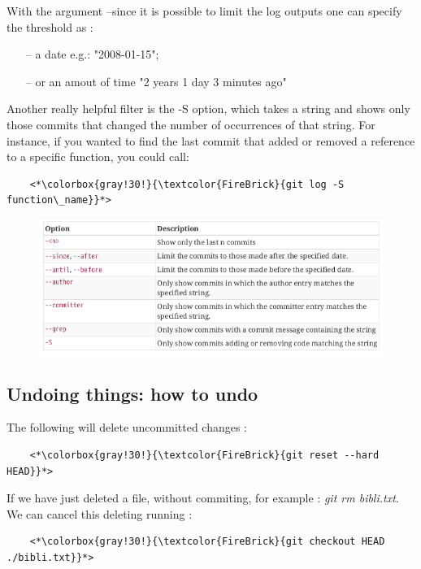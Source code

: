 \documentclass[a4paper,12pt]{article}
\numberwithin{equation}{section} %
\begin{document}
With the argument --since it is possible to limit the log outputs one can specify the threshold as :
\begin{itemize}
	\item[--] a date e.g.: "2008-01-15"; \\
	\item[--] or an amout of time "2 years 1 day 3 minutes ago" \\[4mm]
\end{itemize}

Another really helpful filter is the -S option, which takes a string and shows only those commits that changed the number of occurrences of that string. For instance, if you wanted to find the last commit that added or removed a reference to a specific function, you could call:
\begin{lstlisting}
	<*\colorbox{gray!30!}{\textcolor{FireBrick}{git log -S function\_name}}*>
\end{lstlisting}

\begin{figure}[!ht]
\centering
\includegraphics[scale=0.7]{./pic/tab_log.png}
\end{figure}

\pagebreak

\subsection*{Undoing things: how to undo}
The following will delete uncommitted changes :
\begin{lstlisting}
	<*\colorbox{gray!30!}{\textcolor{FireBrick}{git reset --hard HEAD}}*>
\end{lstlisting}

If we have just deleted a file, without commiting, for example : \textit{git rm bibli.txt}. We can cancel this deleting running :
\begin{lstlisting}
    <*\colorbox{gray!30!}{\textcolor{FireBrick}{git checkout HEAD ./bibli.txt}}*>
\end{lstlisting}
\end{document}

